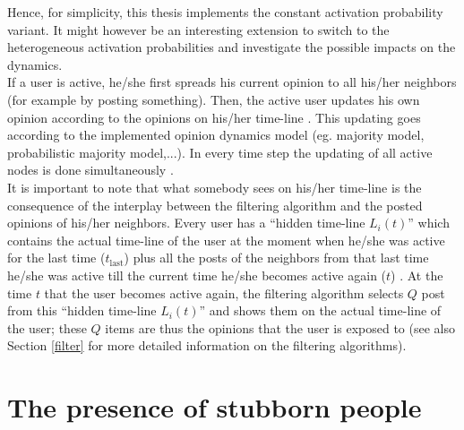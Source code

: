 \documentclass[11 pt , letterpaper , twoside , openright]{book}
\begin{document}
Hence, for simplicity, this thesis implements the constant activation probability variant. It might however be an interesting extension to switch to the heterogeneous activation probabilities and investigate the possible impacts on the dynamics. \\
\newline
If a user is active, he/she first spreads his current opinion to all his/her neighbors (for example by posting something). Then, the active user updates his own opinion according to the opinions on his/her time-line \cite{Perra2019}. This updating goes according to the implemented opinion dynamics model (eg. majority model, probabilistic majority model,...). In every time step the updating of all active nodes is done simultaneously \cite{Perra2019}.\\
It is important to note that what somebody sees on his/her time-line is the consequence of the interplay between the filtering algorithm and the posted opinions of his/her neighbors. Every user has a ``hidden time-line $L_i(t)$'' which contains the actual time-line of the user at the moment when he/she was active for the last time ($t_{\text{last}}$) plus all the posts of the neighbors from that last time he/she was active till the current time he/she becomes active again ($t$) \cite{Perra2019}. At the time $t$ that the user becomes active again, the filtering algorithm selects $Q$ post from this ``hidden time-line $L_i(t)$'' and shows them on the actual time-line of the user; these $Q$ items are thus the opinions that the user is exposed to \cite{Perra2019} (see also Section \ref{filter} for more detailed information on the filtering algorithms).



\newpage
\section{The presence of stubborn people}\label{stubb}
\end{document}
